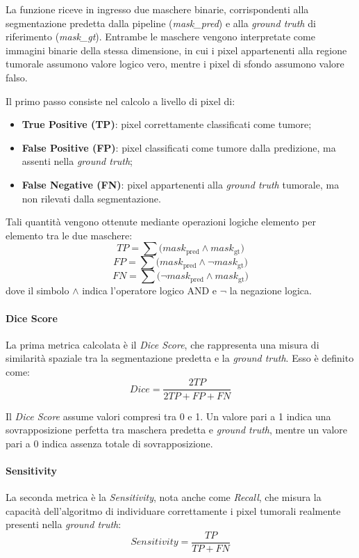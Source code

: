 La funzione riceve in ingresso due maschere binarie, corrispondenti alla segmentazione predetta dalla pipeline (\textit{mask\_pred}) e alla \textit{ground truth} di riferimento (\textit{mask\_gt}). Entrambe le maschere vengono interpretate come immagini binarie della stessa dimensione, in cui i pixel appartenenti alla regione tumorale assumono valore logico vero, mentre i pixel di sfondo assumono valore falso.

Il primo passo consiste nel calcolo a livello di pixel di:
\begin{itemize}
    \item \textbf{True Positive (TP)}: pixel correttamente classificati come tumore;
    \item \textbf{False Positive (FP)}: pixel classificati come tumore dalla predizione, ma assenti nella \textit{ground truth};
    \item \textbf{False Negative (FN)}: pixel appartenenti alla \textit{ground truth} tumorale, ma non rilevati dalla segmentazione.
\end{itemize}

Tali quantità vengono ottenute mediante operazioni logiche elemento per elemento tra le due maschere:
\[
TP = \sum \big(mask_{\text{pred}} \land mask_{\text{gt}}\big)
\]
\[
FP = \sum \big(mask_{\text{pred}} \land \neg mask_{\text{gt}}\big)
\]
\[
FN = \sum \big(\neg mask_{\text{pred}} \land mask_{\text{gt}}\big)
\]
dove il simbolo $\land$ indica l’operatore logico AND e $\neg$ la negazione logica.

\paragraph{Dice Score}
La prima metrica calcolata è il \textit{Dice Score}, che rappresenta una misura di similarità spaziale tra la segmentazione predetta e la \textit{ground truth}. Esso è definito come:
\[
Dice = \frac{2TP}{2TP + FP + FN}
\]

Il \textit{Dice Score} assume valori compresi tra 0 e 1. Un valore pari a 1 indica una sovrapposizione perfetta tra maschera predetta e \textit{ground truth}, mentre un valore pari a 0 indica assenza totale di sovrapposizione.

\paragraph{Sensitivity}
La seconda metrica è la \textit{Sensitivity}, nota anche come \textit{Recall}, che misura la capacità dell’algoritmo di individuare correttamente i pixel tumorali realmente presenti nella \textit{ground truth}:
\[
Sensitivity = \frac{TP}{TP + FN}
\]

